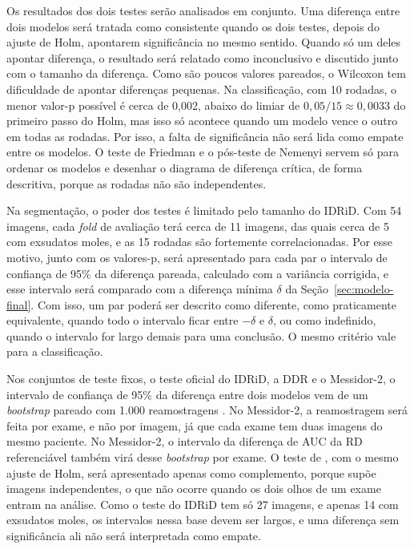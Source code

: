 Os resultados dos dois testes serão analisados em conjunto. Uma diferença entre dois modelos será tratada como consistente quando os dois testes, depois do ajuste de Holm, apontarem significância no mesmo sentido. Quando só um deles apontar diferença, o resultado será relatado como inconclusivo e discutido junto com o tamanho da diferença. Como são poucos valores pareados, o Wilcoxon tem dificuldade de apontar diferenças pequenas. Na classificação, com 10 rodadas, o menor valor-p possível é cerca de 0,002, abaixo do limiar de $0{,}05/15 \approx 0{,}0033$ do primeiro passo do Holm, mas isso só acontece quando um modelo vence o outro em todas as rodadas. Por isso, a falta de significância não será lida como empate entre os modelos. O teste de Friedman e o pós-teste de Nemenyi \cite{demsar2006statistical} servem só para ordenar os modelos e desenhar o diagrama de diferença crítica, de forma descritiva, porque as rodadas não são independentes.

Na segmentação, o poder dos testes é limitado pelo tamanho do IDRiD. Com 54 imagens, cada \textit{fold} de avaliação terá cerca de 11 imagens, das quais cerca de 5 com exsudatos moles, e as 15 rodadas são fortemente correlacionadas. Por esse motivo, junto com os valores-p, será apresentado para cada par o intervalo de confiança de 95\% da diferença pareada, calculado com a variância corrigida, e esse intervalo será comparado com a diferença mínima $\delta$ da Seção~\ref{sec:modelo-final}. Com isso, um par poderá ser descrito como diferente, como praticamente equivalente, quando todo o intervalo ficar entre $-\delta$ e $\delta$, ou como indefinido, quando o intervalo for largo demais para uma conclusão. O mesmo critério vale para a classificação.

Nos conjuntos de teste fixos, o teste oficial do IDRiD, a DDR e o Messidor-2, o intervalo de confiança de 95\% da diferença entre dois modelos vem de um \textit{bootstrap} pareado com 1.000 reamostragens \cite{efron1979bootstrap}. No Messidor-2, a reamostragem será feita por exame, e não por imagem, já que cada exame tem duas imagens do mesmo paciente. No Messidor-2, o intervalo da diferença de AUC da RD referenciável também virá desse \textit{bootstrap} por exame. O teste de , com o mesmo ajuste de Holm, será apresentado apenas como complemento, porque supõe imagens independentes, o que não ocorre quando os dois olhos de um exame entram na análise. Como o teste do IDRiD tem só 27 imagens, e apenas 14 com exsudatos moles, os intervalos nessa base devem ser largos, e uma diferença sem significância ali não será interpretada como empate.

